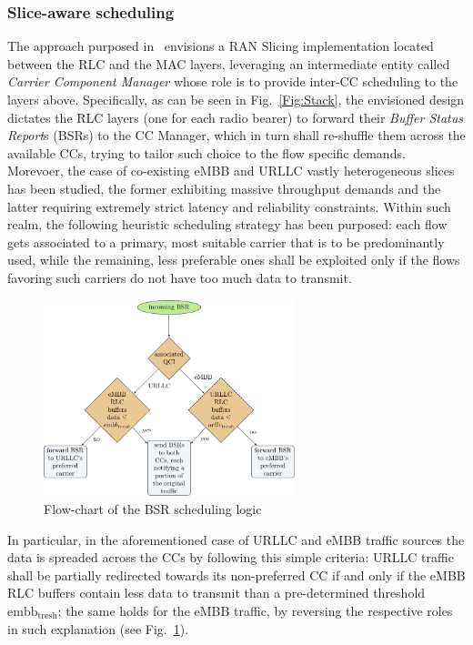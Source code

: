 \documentclass[11pt]{book}
\begin{document}
\subsubsection{Slice-aware scheduling}
The approach purposed in~\cite{pagin2020} envisions a RAN Slicing implementation located between the RLC and the MAC layers, leveraging an intermediate entity called \textit{Carrier Component Manager} whose role is to provide inter-CC scheduling to the layers above. Specifically, as can be seen in Fig.~\ref{Fig:Stack}, the envisioned design dictates the RLC layers (one for each radio bearer) to forward their \textit{Buffer Status Report}s (BSRs) to the CC Manager, which in turn shall re-shuffle them across the available CCs, trying to tailor such choice to the flow specific demands. Morevoer, the case of co-existing eMBB and URLLC vastly heterogeneous slices has been studied, the former exhibiting massive throughput demands and the latter requiring extremely strict latency and reliability constraints. Within such realm, the following heuristic scheduling strategy has been purposed: each flow gets associated to a primary, most suitable carrier that is to be predominantly used, while the remaining, less preferable ones shall be exploited only if the flows favoring such carriers do not have too much data to transmit.
\begin{figure}[t]
  \begin{center}
    \includegraphics[width=0.65\textwidth]{figures/algo-flow-chart.pdf}
  \end{center}
  \caption{Flow-chart of the BSR scheduling logic}
  \label{Fig:FlowChart}
\end{figure}
In particular, in the aforementioned case of URLLC and eMBB traffic sources the data is spreaded across the CCs by following this simple criteria: URLLC traffic shall be partially redirected towards its non-preferred CC if and only if the eMBB RLC buffers contain less data to transmit than a pre-determined threshold $\mathrm{embb_{tresh}}$; the same holds for the eMBB traffic, by reversing the respective roles in such explanation (see Fig.~\ref{Fig:FlowChart}).
\end{document}
